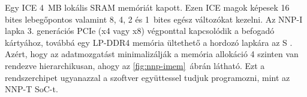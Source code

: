 Egy ICE 4~MB lokális SRAM memóriát kapott. Ezen ICE magok képesek 16 bites lebegőpontos valamint 8, 4, 2 és 1~bites egész változókat kezelni. Az NNP-I lapka 3. generációs PCIe (x4 vagy x8) végponttal kapcsolódik a befogadó kártyához, továbbá egy LP-DDR4 memória ültethető a hordozó lapkára az S . Azért, hogy az adatmozgatást minimalizálják a memória allokáció 4 szinten van rendezve hierarchikusan, ahogy az \ref{fig:nnp-imem}~ábrán látható. Ezt a rendszerchipet ugyanazzal a szoftver együttessel tudjuk programozni, mint az NNP-T SoC-t.
